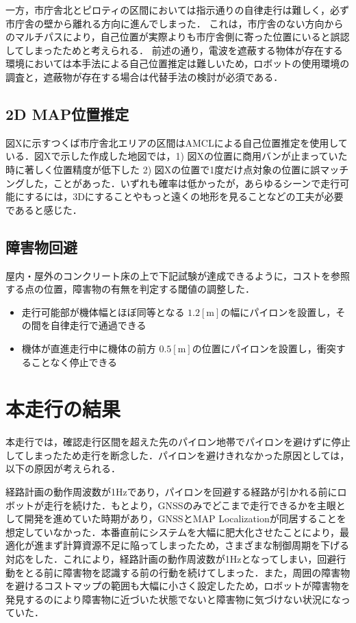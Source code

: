 \documentclass[platex,dvipdfmx]{rbproceedings}
\begin{document}
一方，市庁舎北とピロティの区間においては指示通りの自律走行は難しく，必ず市庁舎の壁から離れる方向に進んでしまった．
これは，市庁舎のない方向からのマルチパスにより，自己位置が実際よりも市庁舎側に寄った位置にいると誤認してしまったためと考えられる．
前述の通り，電波を遮蔽する物体が存在する環境においては本手法による自己位置推定は難しいため，ロボットの使用環境の調査と，遮蔽物が存在する場合は代替手法の検討が必須である．

\subsection{2D MAP位置推定}
図Xに示すつくば市庁舎北エリアの区間はAMCLによる自己位置推定を使用している．図Xで示した作成した地図では，1) 図Xの位置に商用バンが止まっていた時に著しく位置精度が低下した 2) 図Xの位置で1度だけ点対象の位置に誤マッチングした，ことがあった．いずれも確率は低かったが，あらゆるシーンで走行可能にするには，3Dにすることやもっと遠くの地形を見ることなどの工夫が必要であると感じた．

\subsection{障害物回避}
屋内・屋外のコンクリート床の上で下記試験が達成できるように，コストを参照する点の位置，障害物の有無を判定する閾値の調整した．
\begin{itemize}
    \item 走行可能部が機体幅とほぼ同等となる $1.2[\mathrm{m}]$の幅にパイロンを設置し，その間を自律走行で通過できる
    \item 機体が直進走行中に機体の前方  $0.5[\mathrm{m}]$の位置にパイロンを設置し，衝突することなく停止できる
\end{itemize}

\section{本走行の結果}
本走行では，確認走行区間を超えた先のパイロン地帯でパイロンを避けずに停止してしまったため走行を断念した．パイロンを避けきれなかった原因としては，以下の原因が考えられる．

経路計画の動作周波数が1Hzであり，パイロンを回避する経路が引かれる前にロボットが走行を続けた．もとより，GNSSのみでどこまで走行できるかを主眼として開発を進めていた時期があり，GNSSとMAP Localizationが同居することを想定していなかった．本番直前にシステムを大幅に肥大化させたことにより，最適化が進まず計算資源不足に陥ってしまったため，さまざまな制御周期を下げる対応をした．これにより，経路計画の動作周波数が1Hzとなってしまい，回避行動をとる前に障害物を認識する前の行動を続けてしまった．また，周囲の障害物を避けるコストマップの範囲も大幅に小さく設定したため，ロボットが障害物を発見するのにより障害物に近づいた状態でないと障害物に気づけない状況になっていた．
\end{document}
